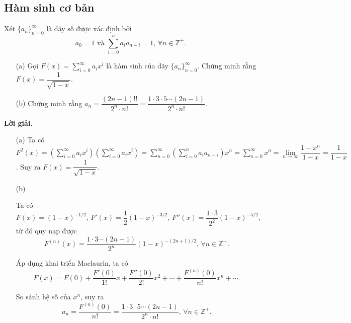 \subsection{Hàm sinh cơ bản}

\begin{tcolorbox}[breakable]
    \begin{baitoan}\label{pb:w02:04}
        Xét $\{a_n\}_{n=0}^\infty$ là dãy số được xác định bởi $$a_0 = 1 \text{ và }\sum\limits_{i=0}^n a_ia_{n-i} = 1,\,\forall n \in \mathbb{Z^+}.$$
        \begin{enumerate}
            \item[(a)] {Gọi $\displaystyle F(x) = \sum\limits_{i=0}^\infty a_ix^i$ là hàm sinh của dãy $\{a_n\}_{n=0}^\infty$. Chứng minh rằng $F(x) = \dfrac{1}{\sqrt{1-x}}$.}
            \item[(b)] {Chứng minh rằng $a_n = \dfrac{(2n-1)!!}{2^n \cdot n!} = \dfrac{1 \cdot 3 \cdot 5 \cdots (2n-1)}{2^n \cdot n!}$.} 
        \end{enumerate}
    \end{baitoan}
\end{tcolorbox}

\textbf{Lời giải. }

\begin{enumerate}
    \item[(a)] {Ta có $\displaystyle F^2(x) = \left(\sum\limits_{i=0}^\infty a_ix^i\right)\left(\sum\limits_{i=0}^\infty a_ix^i\right) = \sum\limits_{n=0}^\infty \left(\sum\limits_{i=0}^n a_ia_{n-i}\right)x^n = \sum\limits_{n=0}^\infty x^n = \lim\limits_{n\to\infty} \dfrac{1-x^n}{1-x} = \dfrac{1}{1-x}$. Suy ra $F(x) = \dfrac{1}{\sqrt{1-x}}$.}
    \item[(b)] {Ta có $F(x) = (1-x)^{-1/2},\,F'(x) = \dfrac{1}{2}(1-x)^{-3/2},\,F''(x) = \dfrac{1 \cdot 3}{2^2}(1-x)^{-5/2},$ từ đó quy nạp được $$F^{(n)}(x) = \dfrac{1 \cdot 3 \cdots (2n-1)}{2^n}(1-x)^{-(2n+1)/2},\,\forall n\in \mathbb{Z^+}.$$
    
    Áp dụng khai triển Maclaurin, ta có $$F(x) = F(0) + \dfrac{F'(0)}{1!}x + \dfrac{F''(0)}{2!}x^2 + \cdots + \dfrac{F^{(n)}(0)}{n!}x^n + \cdots.$$
    
    So sánh hệ số của $x^n$, suy ra $$a_n = \dfrac{F^{(n)}(0)}{n!} = \dfrac{1 \cdot 3 \cdot 5 \cdots (2n-1)}{2^n \cdot n!},\,\forall n\in \mathbb{Z^+}.$$} 
\end{enumerate}


